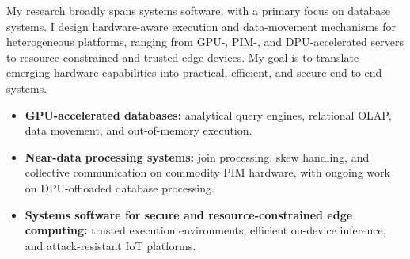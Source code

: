 \documentclass[10pt, a4paper]{awesome-cv}
\newenvironment{researchitems}{%
  \begin{itemize}[leftmargin=1.4em, itemsep=0.2em, topsep=0.2em]
  \small
}{%
  \end{itemize}
}
\begin{document}
\makecvheader
{}

\begin{cvparagraph}
My research broadly spans systems software, with a primary focus on database systems. I design hardware-aware execution and data-movement mechanisms for heterogeneous platforms, ranging from GPU-, PIM-, and DPU-accelerated servers to resource-constrained and trusted edge devices. My goal is to translate emerging hardware capabilities into practical, efficient, and secure end-to-end systems.
\end{cvparagraph}
\begin{researchitems}
  \item \textbf{GPU-accelerated databases:} analytical query engines, relational OLAP, data movement, and out-of-memory execution.
  \item \textbf{Near-data processing systems:} join processing, skew handling, and collective communication on commodity PIM hardware, with ongoing work on DPU-offloaded database processing.
  \item \textbf{Systems software for secure and resource-constrained edge computing:} trusted execution environments, efficient on-device inference, and attack-resistant IoT platforms.
\end{researchitems}
\end{document}
